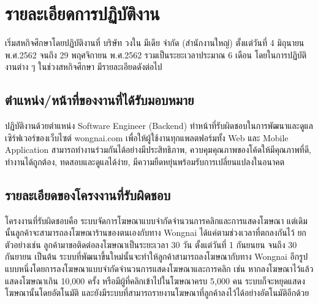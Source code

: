 \chapter{รายละเอียดการปฏิบัติงาน}
\label{chapter:related-theory}

เริ่มสหกิจศึกษาโดยปฏิบัติงานที่ บริษัท วงใน มีเดีย จำกัด (สำนักงานใหญ่) ตั้งแต่วันที่ 4 มิถุนายน พ.ศ.2562 จนถึง 29 พฤศจิกายน พ.ศ.2562 รวมเป็นระยะเวลาประมาณ 6 เดือน โดยในการปฏิบัติงานต่าง ๆ ในช่วงสหกิจศึกษา มีรายละเอียดดังต่อไป

\section{ตำแหน่ง/หน้าที่ของงานที่ได้รับมอบหมาย}
ปฏิบัติงานด้วยตำแหน่ง Software Engineer (Backend) ทำหน้าที่รับผิดชอบในการพัฒนาและดูแลเซิร์ฟเวอร์ของเว็บไซต์ wongnai.com เพื่อให้ผู้ใช้งานทุกแพลตฟอร์มทั้ง  Web และ Mobile Application สามารถทำงานร่วมกันได้อย่างมีประสิทธิภาพ, ควบคุมคุณภาพของโค้ดให้มีคุณภาพที่ดี, ทำงานได้ถูกต้อง, ทดสอบและดูแลได้ง่าย, มีความยืดหยุ่นพร้อมรับการเปลี่ยนแปลงในอนาคต

\section{รายละเอียดของโครงงานที่รับผิดชอบ}
โครงงานที่รับผิดชอบคือ ระบบจัดการโฆษณาแบบจำกัดจำนวนการคลิกและการแสดงโฆษณา แต่เดิมนั้นลูกค้าจะสามารถลงโฆษณาร้านของตนเองกับทาง Wongnai ได้แค่ตามช่วงเวลาที่ตกลงกันไว้ ยกตัวอย่างเช่น ลูกค้ามาขอติดต่อลงโฆษณาเป็นระยะเวลา 30 วัน ตั้งแต่วันที่ 1 กันยนยน จนถึง 30 กันยายน เป็นต้น ระบบที่พัฒนาขึ้นใหม่นั้นจะทำให้ลูกค้าสามารถลงโฆษณากับทาง Wongnai อีกรูปแบบหนึ่งโดยการลงโฆษณาแบบจำกัดจำนวนการแสดงโฆษณาและการคลิก เช่น หากลงโฆษณาไว้แล้วแสดงโฆษณาเกิน 10,000 ครั้ง หรือมีผู้ที่คลิกเข้าไปในโฆษณาครบ 5,000 คน ระบบก็จะหยุดแสดงโฆษณานั้นโดยอัตโนมัติ และยังมีระบบที่สามารถรายงานโฆษณาที่ลูกค้าลงไว้ได้อย่างอัตโนมัติอีกด้วย

